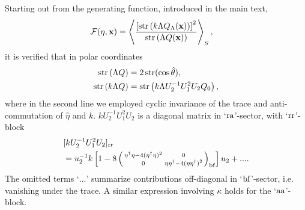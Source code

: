 \documentclass[twocolumn,showpacs,aps,prl]{revtex4}
\begin{document}
Starting out from the generating function, 
introduced in the main text,
 \begin{align}
{\cal F}(\eta,\bold{x})
 &=
\left\langle 
{
\left[
{\rm str}\left(k\Lambda Q_\Lambda(\bold{x})\right)
\right]^2
\over
{\rm str}\left(\Lambda Q(\bold{x})\right)
}
\right\rangle_S,
\end{align}
it is verified that in polar coordinates
\begin{align}
{\rm str}\left(\Lambda Q\right)
&=
2\,{\rm str}( 
\cos\hat{\theta}), 
\\
{\rm str}\left(k\Lambda Q\right)
&=
{\rm str}\left(k \Lambda U_2^{-1} U^2_1U_2 Q_0\right),
\end{align}
where in the second line 
we employed cyclic invariance of the trace and anti-commutation of 
$\hat{\eta}$ and $k$.
 $k U_2^{-1}U_1^{2}U_2$ is a diagonal matrix in `${\rm ra}$'-sector,  
with `${\rm rr}$'-block 
\begin{align}
&
[ k U_2^{-1}U_1^{2}U_2]_{\rm rr}
\nonumber\\
&=
u_2^{-1}
k
\left[
1
-
8
\left(
\begin{smallmatrix}
\eta^\dagger\eta
-
4 (\eta^\dagger \eta)^2
& 0
\\ 0 
&
\eta \eta^\dagger 
-
4 (\eta  \eta^\dagger)^2 
\end{smallmatrix}\right)_{\rm bf}
\right]
u_2
+
... .
\end{align}
The omitted terms `$...$' summarize contributions  
off-diagonal in `${\rm bf}$'-sector, i.e. vanishing under the trace.
A similar expression involving $\kappa$ holds for the `${\rm aa}$'-block. 
\end{document}
